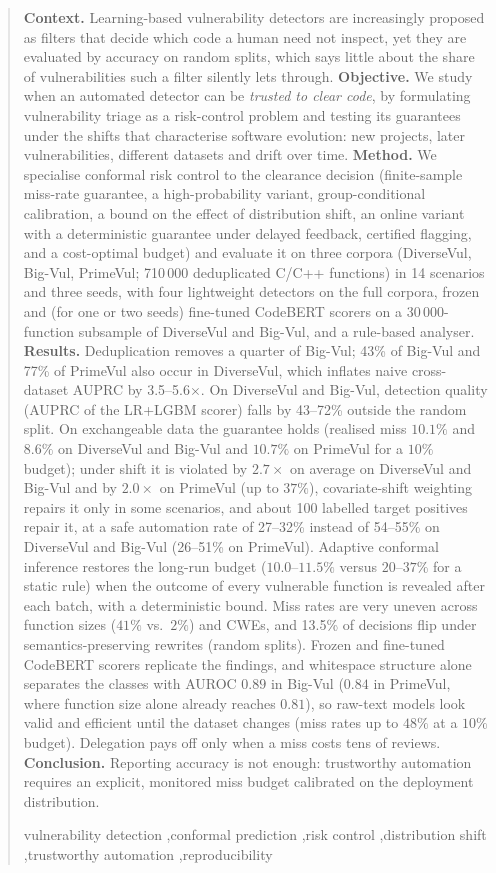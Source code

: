 \begin{abstract}
\textbf{Context.} Learning-based vulnerability detectors are increasingly proposed as filters that decide which code a human need not inspect, yet they are evaluated by accuracy on random splits, which says little about the share of vulnerabilities such a filter silently lets through.
\textbf{Objective.} We study when an automated detector can be \emph{trusted to clear code}, by formulating vulnerability triage as a risk-control problem and testing its guarantees under the shifts that characterise software evolution: new projects, later vulnerabilities, different datasets and drift over time.
\textbf{Method.} We specialise conformal risk control to the clearance decision (finite-sample miss-rate guarantee, a high-probability variant, group-conditional calibration, a bound on the effect of distribution shift, an online variant with a deterministic guarantee under delayed feedback, certified flagging, and a cost-optimal budget) and evaluate it on three corpora (DiverseVul, Big-Vul, PrimeVul; 710\,000 deduplicated C/C++ functions) in 14 scenarios and three seeds, with four lightweight detectors on the full corpora, frozen and (for one or two seeds) fine-tuned CodeBERT scorers on a 30\,000-function subsample of DiverseVul and Big-Vul, and a rule-based analyser.
\textbf{Results.} Deduplication removes a quarter of Big-Vul; 43\% of Big-Vul and 77\% of PrimeVul also occur in DiverseVul, which inflates naive cross-dataset AUPRC by 3.5--5.6$\times$. On DiverseVul and Big-Vul, detection quality (AUPRC of the LR+LGBM scorer) falls by 43--72\% outside the random split. On exchangeable data the guarantee holds (realised miss $10.1\%$ and $8.6\%$ on DiverseVul and Big-Vul and $10.7\%$ on PrimeVul for a $10\%$ budget); under shift it is violated by $2.7\times$ on average on DiverseVul and Big-Vul and by $2.0\times$ on PrimeVul (up to $37\%$), covariate-shift weighting repairs it only in some scenarios, and about 100 labelled target positives repair it, at a safe automation rate of 27--32\% instead of 54--55\% on DiverseVul and Big-Vul (26--51\% on PrimeVul). Adaptive conformal inference restores the long-run budget ($10.0$--$11.5\%$ versus $20$--$37\%$ for a static rule) when the outcome of every vulnerable function is revealed after each batch, with a deterministic bound. Miss rates are very uneven across function sizes ($41\%$ vs.\ $2\%$) and CWEs, and 13.5\% of decisions flip under semantics-preserving rewrites (random splits). Frozen and fine-tuned CodeBERT scorers replicate the findings, and whitespace structure alone separates the classes with AUROC $0.89$ in Big-Vul ($0.84$ in PrimeVul, where function size alone already reaches $0.81$), so raw-text models look valid and efficient until the dataset changes (miss rates up to $48\%$ at a $10\%$ budget). Delegation pays off only when a miss costs tens of reviews.
\textbf{Conclusion.} Reporting accuracy is not enough: trustworthy automation requires an explicit, monitored miss budget calibrated on the deployment distribution.
\begin{keyword}
vulnerability detection \sep conformal prediction \sep risk control \sep distribution shift \sep trustworthy automation \sep reproducibility
\end{keyword}
\end{abstract}
